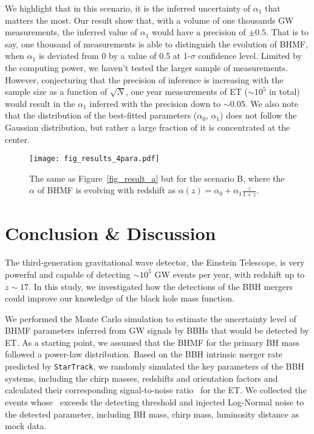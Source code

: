 \documentclass[twocolumn]{aastex62}
\newcommand{\kai}[1]{\textcolor{red}{[{\bf Kai}: #1]}}
\begin{document}
We highlight that in this scenario, it is the inferred uncertainty of $\alpha_1$ that matters the most. Our result show that, with a volume of one thousands GW measurements, the inferred value of $\alpha_1$ would have a precision of $\pm0.5$. That is to say, one thousand of measurements is able to distinguish the evolution of BHMF, when $\alpha_1$ is deviated from 0 by a value of 0.5 at 1-$\sigma$ confidence level. Limited by the computing power, we haven't tested the larger sample of measurements. However, conjecturing that the precision of inference is increasing with the sample size as a function of $\sqrt{N}$, one year measurements of ET ($\sim10^5$ in total) would result in the $\alpha_1$ inferred with the precision down to $\sim0.05$.
We also note that the distribution of the best-fitted parameters ($\alpha_0$, $\alpha_1$) does not follow the Gaussian distribution, but rather a large fraction of it is concentrated at the center. 

\begin{figure}%
\texttt{[image: fig\_results\_4para.pdf]}
\caption{
The same as Figure~\ref{fig_result_a} but for the scenario B, where the $\alpha$ of BHMF is evolving with redshift as $\alpha(z) = \alpha_0 + \alpha_1\frac{z}{1+z}$. 
}
\label{fig_result_b}
\end{figure}

\vspace{1cm}
\section{Conclusion \& Discussion} \label{sec_summary}
The third-generation gravitational wave detector, the Einstein Telescope, is very powerful and capable of detecting $\sim10^5$ GW events per year, with redshift up to $z\sim17$. In this study, we investigated how the detections of the BBH mergers could improve our knowledge of the black hole mass function.

We performed the Monte Carlo simulation to estimate the uncertainty level of BHMF parameters inferred from GW signals by BBHs that would be detected by ET. As a starting point, we assumed that the BHMF for the primary BH mass followed a power-law distribution. Based on the BBH intrinsic merger rate predicted by {\tt StarTrack}, we randomly simulated the key parameters of the BBH systems, including the chirp masses, redshifts and orientation factors and calculated  their corresponding signal-to-noise ratio \snr\ for the ET. We collected the events whose \snr\ exceeds the detecting threshold and injected Log-Normal noise to the detected parameter, including BH mass, chirp mass, luminosity distance as mock data.
\end{document}
